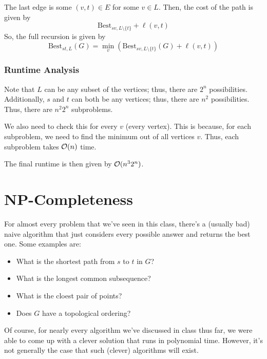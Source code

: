\documentclass[letterpaper]{article}
\begin{document}
\bigskip 

The last edge is some $(v, t) \in E$ for some $v \in L$. Then, the cost of the path is given by 
\[\text{Best}_{sv, L \setminus \{t\}} + \ell(v, t)\]
So, the full recursion is given by 
\[\text{Best}_{st, L}(G) = \min_v \left(\text{Best}_{sv, L \setminus \{t\}}(G) + \ell(v, t)\right)\]

\subsubsection{Runtime Analysis}
Note that $L$ can be any subset of the vertices; thus, there are $2^n$ possibilities. Additionally, $s$ and $t$ can both be any vertices; thus, there are $n^2$ possibilities. Thus, there are $n^2 2^n$ subproblems. 

\bigskip 

We also need to check this for every $v$ (every vertex). This is because, for each subproblem, we need to find the minimum out of all vertices $v$. Thus, each subproblem takes $\mathcal{O}(n)$ time. 

\bigskip 

The final runtime is then given by $\mathcal{O}(n^3 2^n)$. 
















\newpage 
\section{NP-Completeness}
For almost every problem that we've seen in this class, there's a (usually bad) naive algorithm that just considers every possible answer and returns the best one. Some examples are: 
\begin{itemize}
    \item What is the shortest path from $s$ to $t$ in $G$? 
    \item What is the longest common subsequence? 
    \item What is the cloest pair of points? 
    \item Does $G$ have a topological ordering?
\end{itemize}
Of course, for nearly every algorithm we've discussed in class thus far, we were able to come up with a clever solution that runs in polynomial time. However, it's not generally the case that such (clever) algorithms will exist. 
\end{document}
